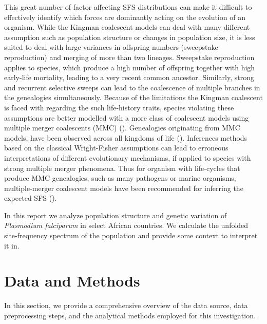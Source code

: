 \documentclass[11pt]{article}
\begin{document}
This great number of factor affecting SFS distributions can make it difficult to effectively identify which forces are dominantly acting on the evolution of an organism. While the Kingman coalescent models can deal with many different assumption such as population structure or changes in population size, it is less suited to deal with large variances in offspring numbers (sweepstake reproduction) and merging of more than two lineages. Sweepstake reproduction applies to species, which produce a high number of offspring together with high early-life mortality, leading to a very recent common ancestor. Similarly, strong and recurrent selective sweeps can lead to the coalescence of multiple branches in the genealogies simultaneously. Because of the limitations the Kingman coalescent is faced with regarding the such life-history traits, species violating these assumptions are better modelled with a more class of coalescent models using multiple merger coalescents (MMC) (\cite{tellier-2014-coales}). Genealogies originating from MMC models, have been observed across all kingdoms of life (\cite{freund-2023-inter-pervas}). Inferences methods based on the classical Wright-Fisher assumptions can lead to erroneous interpretations of different evolutionary mechanisms, if applied to species with strong multiple merger phenomena. Thus for organism with life-cycles that produce MMC genealogies, such as many pathogens or marine organisms, multiple-merger coalescent models have been recommended for inferring the expected SFS (\cite{freund-2023-inter-pervas}).

In this report we analyze population structure and genetic variation of \emph{Plasmodium falciparum} in select African countries. We calculate the unfolded site-frequency spectrum of the population and provide some context to interpret it in.
\section*{Data and Methods}
\label{sec:org82bf919}
In this section, we provide a comprehensive overview of the data source, data preprocessing steps, and the analytical methods employed for this investigation.
\end{document}
